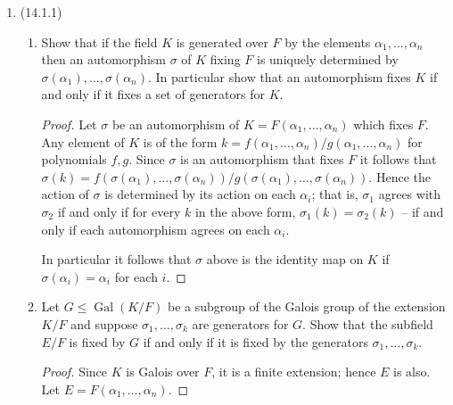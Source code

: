 \documentclass[11pt]{article}
\DeclareMathOperator{\Gal}{Gal}
\begin{document}
\begin{enumerate}
\begin{enumerate}
\begin{proof}
            Therefore:
            
            When $p \equiv 6 \pmod 7$, $\varPhi_7(x)$ is the product of $(7-1)/2 = 3$ degree $2$ factors.
            
            When $p \equiv 6 \pmod 7$, $\varPhi_7(x)$ is the product of $(7-1)/2 = 3$ degree $2$ factors.
            
            When $p \equiv 2,4 \pmod 7$, $\varPhi_7(x)$ is the product of $(7-1)/3 = 2$ degree $3$ factors.
            
            When $p \equiv 3,5 \pmod 7$, $\varPhi_7(x)$ is the product of $(7-1)/6 = 1$ degree $6$ factor (i.e. it is irreducible).
        \end{proof}
    \end{enumerate}
    \item (14.1.1) \begin{enumerate}
        \item Show that if the field $K$ is generated over $F$ by the elements $\alpha_1,\dots, \alpha_n$ then an automorphism $\sigma$ of $K$ fixing $F$ is uniquely determined by $\sigma(\alpha_1),\dots, \sigma(\alpha_n)$. In particular show that an automorphism fixes $K$ if and only if it fixes a set of generators for $K$. \begin{proof}
            Let $\sigma$ be an automorphism of $K = F(\alpha_1,\dots,\alpha_n)$ which fixes $F$. Any element of $K$ is of the form $k = f(\alpha_1,\dots,\alpha_n)/g(\alpha_1,\dots,\alpha_n)$ for polynomials $f,g$. Since $\sigma$ is an automorphism that fixes $F$ it follows that $\sigma(k) = f(\sigma(\alpha_1),\dots,\sigma(\alpha_n))/g(\sigma(\alpha_1),\dots,\sigma(\alpha_n))$. Hence the action of $\sigma$ is determined by its action on each $\alpha_i$; that is, $\sigma_1$ agrees with $\sigma_2$ if and only if for every $k$ in the above form, $\sigma_1(k) = \sigma_2(k)$ -- if and only if each automorphism agrees on each $\alpha_i$.

            In particular it follows that $\sigma$ above is the identity map on $K$ if $\sigma(\alpha_i) = \alpha_i$ for each $i$.
        \end{proof}
        \item Let $G\leq \Gal(K/F)$ be a subgroup of the Galois group of the extension $K/F$ and suppose $\sigma_1,\dots, \sigma_k$ are generators for $G$. Show that the subfield $E/F$ is fixed by $G$ if and only if it is fixed by the generators $\sigma_1,\dots,\sigma_k$. \begin{proof}
            Since $K$ is Galois over $F$, it is a finite extension; hence $E$ is also. Let $E = F(\alpha_1,\dots,\alpha_n)$.


\end{proof}
\end{enumerate}
\end{enumerate}
\end{document}
